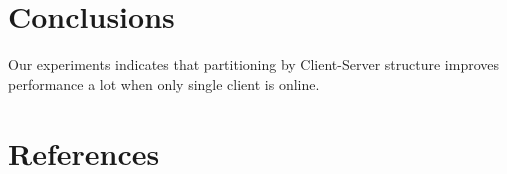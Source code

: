 \documentclass[a4paper,11pt,onecolumn,twoside]{article}
\begin{document}
\begin{CJK*}{GBK}{song}
\section{Conclusions}

Our experiments indicates that partitioning by Client-Server structure improves performance a lot when only single client is online.

\section{References}

\nocite{1508.06576}
\nocite{tensorflow2015-whitepaper}


 



\clearpage
\end{CJK*}
\end{document}

